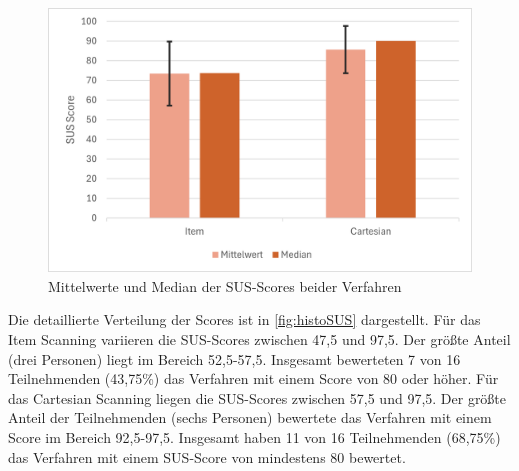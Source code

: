 \begin{figure}[tbh]
    \centering
   \includegraphics[scale=0.75]{images/Results/SUS-Scores.png}
    \caption{Mittelwerte und Median der SUS-Scores beider Verfahren}
    \label{fig:resultsSUS}
   \end{figure}

Die detaillierte Verteilung der Scores ist in \autoref{fig:histoSUS} dargestellt. Für das Item Scanning variieren die SUS-Scores zwischen 47,5 und 97,5. Der größte Anteil (drei Personen) liegt im Bereich 52,5-57,5. Insgesamt bewerteten 7 von 16 Teilnehmenden (43,75\%) das Verfahren mit einem Score von 80 oder höher. Für das Cartesian Scanning liegen die SUS-Scores zwischen 57,5 und 97,5. Der größte Anteil der Teilnehmenden (sechs Personen) bewertete das Verfahren mit einem Score im Bereich 92,5-97,5. Insgesamt haben 11 von 16 Teilnehmenden (68,75\%) das Verfahren mit einem SUS-Score von mindestens 80 bewertet. 

